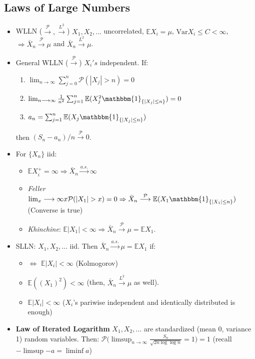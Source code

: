 \documentclass[11pt]{article}
\newcommand{\var}{\mrm{Var}}
\renewcommand{\P}{\mathbb{P}}
\newcommand{\mrm}{\mathrm}
\newcommand\abs[1]{\left|#1\right|}
\newcommand{\ind}[1]{\mathbbm{1}_{\{#1\}}}
\renewcommand{\to}{\longrightarrow}
\newcommand{\asto}{\overset{a.s.}{\to}}
\newcommand{\pto}{\overset{\P}{\to}}
\newcommand{\Lp}[1]{\overset{L^#1}\to}
\renewcommand{\P}{\mathcal{P}}
\newcommand{\E}{\mathbb{E}}
\newcommand{\imp}{\Rightarrow}
\newcommand{\gm}{\mu}
\newcommand{\seq}[1]{\{#1\}}
\begin{document}
\begin{multicols}{2}
\subsection{Laws of Large Numbers}
\begin{itemize}
\item WLLN ($\pto, \Lp{2}$) $X_1,X_2,\ldots$ uncorrelated, $\E X_i = \gm$, $\var{X_i} \leq C<\infty$, $\imp \bar{X}_n \pto \gm$ and $\bar{X}_n \Lp{2} \gm$.
\item General WLLN ($\pto$)  $X_i's$ independent.  If:
\begin{enumerate}
\item $\lim_{n \to \infty} \sum_{j=0}^n \P(\abs{X_j}>n)=0$
\item $\lim_{n \to \infty} \frac{1}{n^2} \sum_{j=1}^n \E( X_j^2 \ind{\abs{X_j} \leq n})=0$
\item $a_n=\sum_{j=1}^n \E ( X_j \ind{ \abs{X_j}\leq n})$
\end{enumerate}
then $(S_n-a_n)/n \pto 0$.
\item For $\seq{X_n}$ iid:
\begin{itemize}
\item $\E X_i^+ = \infty \imp \bar{X}_n \asto \infty$
\item \textit{Feller} $\lim_x \to \infty x\P(\abs{X_1}>x) =0 \imp \bar{X}_n \pto \E (X_1 \ind{\abs{X_1}\leq n})$ (Converse is true)
\item \textit{Khinchine}: $\E \abs{X_1}<\infty \imp \bar{X}_n \pto \mu = \E X_1$. 
\end{itemize}
\item SLLN: $X_1,X_2, \ldots$ iid.  Then $\bar{X}_n \asto \gm = \E X_1$ if:
\begin{itemize}
\item $\iff$ $\E \abs{X_i} < \infty$ (Kolmogorov)
\item $\E((X_1)^2) < \infty$ (then, $\bar{X}_n \Lp{2} \gm$ as well).
\item $\E \abs{X_i}< \infty$ ($X_i$'s pariwise independent and identically distributed is enough)
\end{itemize}
\item \textbf{Law of Iterated Logarithm} $X_1, X_2,\ldots$ are standardized (mean 0, variance 1) random variables.  Then: $\P \big( \limsup_{n \to \infty} \frac{S_n}{\sqrt{2n \log{\log{n}}}} =1 \big)=1$ (recall $-\limsup{-a}=\liminf{a}$) 
\end{itemize}

\end{multicols}
\end{document}
